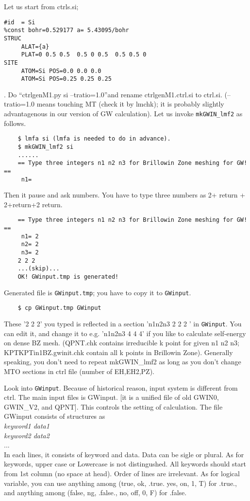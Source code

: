 \documentclass[a4paper,10pt,epsf,fleqn]{article}
\begin{document}
Let us start from ctrls.si;
\begin{verbatim}
#id  = Si
%const bohr=0.529177 a= 5.43095/bohr
STRUC
     ALAT={a} 
     PLAT=0 0.5 0.5  0.5 0 0.5  0.5 0.5 0 
SITE
     ATOM=Si POS=0.0 0.0 0.0
     ATOM=Si POS=0.25 0.25 0.25
\end{verbatim}
. Do ``ctrlgenM1.py si --tratio=1.0''and rename ctrlgenM1.ctrl.si to
ctrl.si. (--tratio=1.0 means touching MT (check it by lmchk); 
it is probably slightly advantagenous in our version of GW calculation).
Let us invoke \verb+mkGWIN_lmf2+ as follows.
\begin{verbatim}
    $ lmfa si (lmfa is needed to do in advance).
    $ mkGWIN_lmf2 si
    ......
    == Type three integers n1 n2 n3 for Brillowin Zone meshing for GW! ==
     n1=
\end{verbatim}
Then it pause and ask numbers. You have to type three numbers as
2+ return + 2+return+2 return.
\begin{verbatim}
    == Type three integers n1 n2 n3 for Brillowin Zone meshing for GW! ==
     n1= 2
     n2= 2
     n3= 2
    2 2 2
    ...(skip)...
    OK! GWinput.tmp is generated!
\end{verbatim}
Generated file is \verb+GWinput.tmp+; you have to copy it to \verb+GWinput+.
\begin{verbatim}
    $ cp GWinput.tmp GWinput
\end{verbatim}
These '2 2 2' you typed is reflected in a section 'n1n2n3 2 2 2 ' in \verb+GWinput+.
You can edit it, and change it to e.g. 'n1n2n3 4 4 4' if you like to
calculate self-energy on dense BZ mesh. (QPNT.chk contains irreducible k
point for given n1 n2 n3; KPTKPTin1BZ.gwinit.chk contain all k points in
Brillowin Zone). Generally speaking, you don't need to repeat mkGWIN\_lmf2 
as long as you don't change MTO sections in ctrl file (number of EH,EH2,PZ).

Look into \verb+GWinput+. Because of historical reason,
input system is different from ctrl.
The main input files is {\sf GWinput}.
[it is a unified file of old {\sf GWIN0},  {\sf GWIN\_V2}, and {\sf QPNT}].
This controls the setting of \GW calculation.
The file {\sf GWinput} consists of
structures as\\
{\it keyword1 data1}\\
{\it keyword2 data2}\\
...\\
In each lines, it consists of keyword and data. 
Data can be sigle or plural.
As for keywords, upper case or Lowercase is not distingushed.
All keywords should start from 1st column (no space at head).
Order of lines are irrelevant.
As for logical variable, you can use 
anything among (true, ok, .true. yes, on, 1, T) for .true.,
and anything among (false, ng, .false., no, off, 0, F) for .false.\\
\end{document}

